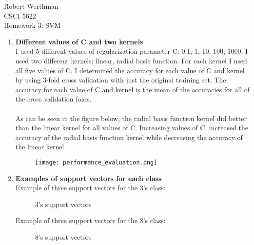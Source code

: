 \documentclass[10pt]{article}
\begin{document}
\noindent
Robert Werthman\\
CSCI 5622\\
Homework 3: SVM\\

\begin{enumerate}
  \item\textbf{Different values of C and two kernels}\\
  I used 5 different values of regularization parameter C: 0.1, 1, 10, 100,
  1000.  I used two different kernels: linear, radial basis function.  For each
  kernel I used all five values of C. I determined
  the accuracy for each value of C and kernel by using 3-fold cross validation
  with just the original training set.  The accuracy for each value of C and
  kernel is the mean of the accuracies for all of the cross validation folds.\\
  \\ 
  As can be seen in the figure below, the radial basis function kernel did
  better than the linear kernel for all values of C.  Increasing values of C,
  increased the accuracy of the radial basis function kernel while decreasing
  the accuracy of the linear kernel. 
  \begin{figure}[H]
    \centering
    \texttt{[image: performance\_evaluation.png]}
    \end{figure}
  \item \textbf{Examples of support vectors for each class}\\
  Example of three support vectors for the 3's class:
    \begin{figure}[H]
    \centering
     \caption{3's support vectors}
    \end{figure}
    Example of three support vectors for the 8's class:
    \begin{figure}[H]
    \centering
     \caption{8's support vectors}
    \end{figure}
\end{enumerate}
\end{document}

